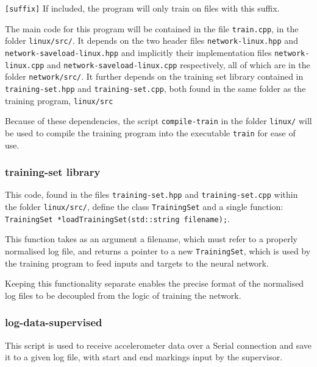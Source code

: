 \documentclass[a4paper]{article}
\begin{document}
\lstinline{[suffix]} If included, the program will only train on files with this suffix. 

The main code for this program will be contained in the file \lstinline{train.cpp}, in the folder \lstinline{linux/src/}. It depends on the two header files \lstinline{network-linux.hpp} and \lstinline{network-saveload-linux.hpp} and implicitly their implementation files \lstinline{network-linux.cpp} and \lstinline{network-saveload-linux.cpp} respectively, all of which are in the folder \lstinline{network/src/}. It further depends on the training set library contained in \lstinline{training-set.hpp} and \lstinline{training-set.cpp}, both found in the same folder as the training program, \lstinline{linux/src}


Because of these dependencies, the script \lstinline{compile-train} in the folder \lstinline{linux/} will be used to compile the training program into the executable \lstinline{train} for ease of use.

\subsubsection{training-set library}
\label{subsubsec:dc_csa_trainingset}

This code, found in the files \lstinline{training-set.hpp} and \lstinline{training-set.cpp} within the folder \lstinline{linux/src/}, define the class \lstinline{TrainingSet} and a single function: \lstinline{TrainingSet *loadTrainingSet(std::string filename);}.

This function takes as an argument a filename, which must refer to a properly normalised log file, and returns a pointer to a new \lstinline{TrainingSet}, which is used by the training program to feed inputs and targets to the neural network.

Keeping this functionality separate enables the precise format of the normalised log files to be decoupled from the logic of training the network.

\subsubsection{log-data-supervised}
\label{subsubsec:dc_csa_logsupervised}

This script is used to receive accelerometer data over a Serial connection and save it to a given log file, with start and end markings input by the supervisor.
\end{document}
